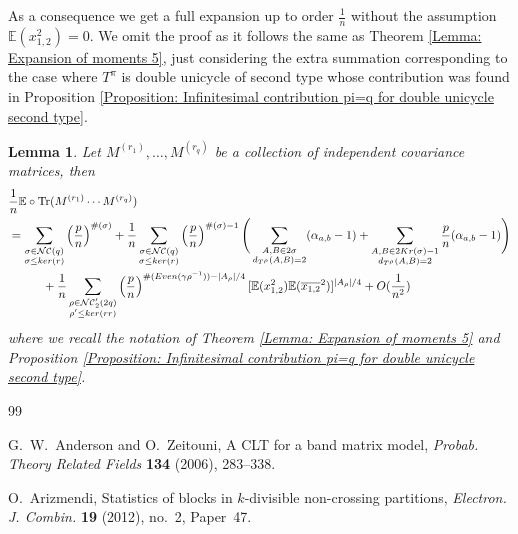 \documentclass{article}
\newtheorem{lemma}      [theorem]{Lemma}
\theoremstyle{definition}
\newcommand{\E}{\mathbb{E}}
\newcommand{\NC}{\mathcal{NC}}
\newcommand{\Tr}{\text{Tr}}
\begin{document}
{As a consequence we get a full expansion up to order $\frac{1}{n}$ without the assumption $\mathbb{E}(x_{1,2}^2)=0$. We omit the proof as it follows the same as Theorem \ref{Lemma: Expansion of moments 5}, just considering the extra summation corresponding to the case where $T^\pi$ is double unicycle of second type whose contribution was found in Proposition \ref{Proposition: Infinitesimal contribution pi=q for double unicycle second type}.

\begin{lemma}\label{Lemma: Expansion of moments without pseudo variace zero}
Let $M^{(r_1)},\dots, M^{(r_q)}$ be a collection of independent covariance matrices, then
\begin{align*}
&\frac{1}{n}\E\circ \textup{\Tr}(M^{(r_1)}\cdots M^{(r_q)}) \\
&=\sum_{\substack{\sigma\in \NC(q) \\ \sigma\leq ker(r)}}\left(\frac{p}{n}\right)^{\#(\sigma)}+ 
\frac{1}{n}\sum_{\substack{\sigma\in \NC(q) \\ \sigma\leq ker(r)}}\left(\frac{p}{n}\right)^{\#(\sigma)-1}\Bigg(\sum_{\substack{A,B\in 2\sigma \\ d_{T^\rho}(A,B)=2}}(\alpha_{a,b}-1)+\sum_{\substack{A,B\in 2Kr(\sigma)-1 \\ d_{T^\rho}(A,B)=2}}\frac{p}{n}(\alpha_{a,b}-1)\Bigg) \\
&\hspace{1cm}+\frac{1}{n}\sum_{\substack{\rho\in \NC_2^\prime(2q) \\ \rho^\prime \leq ker(rr)}}\left( \frac{p}{n}\right)^{\#(Even(\gamma\rho^{-1}))-|A_\rho|/4}[\mathbb{E}(x_{1,2}^2)\mathbb{E}(\overline{x_{1,2}}^2)]^{|A_\rho|/4} +O(\frac{1}{n^2})
\end{align*}
where we recall the notation of Theorem \ref{Lemma: Expansion of moments 5} and Proposition \ref{Proposition: Infinitesimal contribution pi=q for double unicycle second type}.
\end{lemma}

\begin{thebibliography}{99}

G.~W.~Anderson and O.~Zeitouni,
\newblock A CLT for a band matrix model,
\newblock \emph{Probab. Theory Related Fields}
\textbf{134} (2006), 283--338.

O.~Arizmendi,
\newblock Statistics of blocks in $k$-divisible non-crossing partitions,
\newblock \emph{Electron. J. Combin.}
\textbf{19} (2012), no.~2, Paper~47.


\end{thebibliography}}
\end{document}
